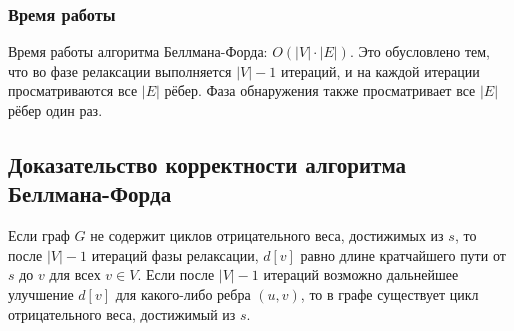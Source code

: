\subsubsection{Время работы}
Время работы алгоритма Беллмана-Форда: $O(|V| \cdot |E|)$.
Это обусловлено тем, что во фазе релаксации выполняется $|V|-1$ итераций, и на каждой итерации просматриваются все $|E|$ рёбер. Фаза обнаружения также просматривает все $|E|$ рёбер один раз.

\subsection{Доказательство корректности алгоритма Беллмана-Форда}

\begin{theorem}
	Если граф $G$ не содержит циклов отрицательного веса, достижимых из $s$, то после $|V|-1$ итераций фазы релаксации, $d[v]$ равно длине кратчайшего пути от $s$ до $v$ для всех $v \in V$.
	Если после $|V|-1$ итераций возможно дальнейшее улучшение $d[v]$ для какого-либо ребра $(u,v)$, то в графе существует цикл отрицательного веса, достижимый из $s$.
\end{theorem}

